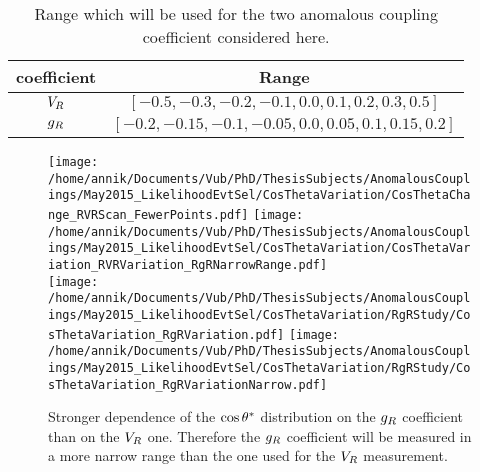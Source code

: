 \begin{table}[h!t]
 \centering
 \caption{Range which will be used for the two anomalous coupling coefficient considered here.}
 \label{table::CoefRange}
 \begin{tabular}{c|c}
  coefficient 	& Range 								\\
  \hline
  $V_{R}$ 	& $\left[-0.5, -0.3, -0.2, -0.1, 0.0, 0.1, 0.2, 0.3, 0.5 \right]$ 	\\
  $g_{R}$ 	& $\left[-0.2, -0.15, -0.1, -0.05, 0.0, 0.05, 0.1, 0.15, 0.2 \right]$
 \end{tabular}
\end{table}

\begin{figure}[h!t]
 \centering
 \texttt{[image: /home/annik/Documents/Vub/PhD/ThesisSubjects/AnomalousCouplings/May2015\_LikelihoodEvtSel/CosThetaVariation/CosThetaChange\_RVRScan\_FewerPoints.pdf]}
 \texttt{[image: /home/annik/Documents/Vub/PhD/ThesisSubjects/AnomalousCouplings/May2015\_LikelihoodEvtSel/CosThetaVariation/CosThetaVariation\_RVRVariation\_RgRNarrowRange.pdf]}\\
 \texttt{[image: /home/annik/Documents/Vub/PhD/ThesisSubjects/AnomalousCouplings/May2015\_LikelihoodEvtSel/CosThetaVariation/RgRStudy/CosThetaVariation\_RgRVariation.pdf]}
 \texttt{[image: /home/annik/Documents/Vub/PhD/ThesisSubjects/AnomalousCouplings/May2015\_LikelihoodEvtSel/CosThetaVariation/RgRStudy/CosThetaVariation\_RgRVariationNarrow.pdf]}
 \caption{Stronger dependence of the $\cos \theta^{*}$ distribution on the $g_{R}$ coefficient than on the $V_{R}$ one. Therefore the $g_{R}$ coefficient will be measured in a more narrow range than the one used for the $V_{R}$ measurement.}
 \label{fig::CoefSensitivity}
\end{figure}

